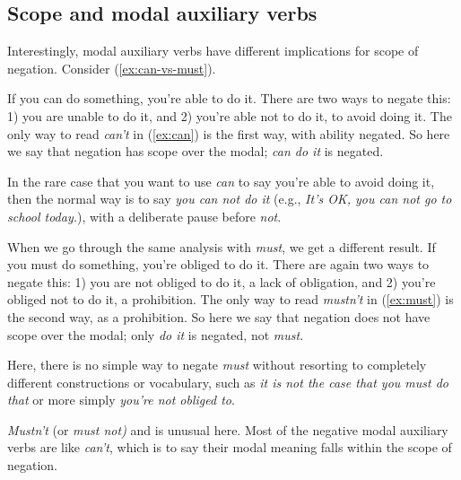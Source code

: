 \subsection{Scope and modal auxiliary verbs}

Interestingly, modal auxiliary verbs have different implications for scope of negation. Consider (\ref{ex:can-vs-must}).

\begin{multicols}{2}
\ea \label{ex:can-vs-must}
    \ea \label{ex:can}
    \z
    \ex \label{ex:must}
        \z
    \z
\z
\end{multicols}

If you can do something, you're able to do it. There are two ways to negate this: 1) you are unable to do it, and 2) you're able not to do it, to avoid doing it. The only way to read \textit{can't} in (\ref{ex:can}) is the first way, with ability negated. So here we say that negation has scope over the modal; \textit{can do it} is negated.

In the rare case that you want to use \textit{can} to say you're able to avoid doing it, then the normal way is to say \textit{you can not do it} (e.g., \textit{It's OK, you can not go to school today.}), with a deliberate pause before \textit{not}. 

When we go through the same analysis with \textit{must}, we get a different result. If you must do something, you're obliged to do it. There are again two ways to negate this: 1) you are not obliged to do it, a lack of obligation, and 2) you're obliged not to do it, a prohibition. The only way to read \textit{mustn't} in (\ref{ex:must}) is the second way, as a prohibition. So here we say that negation does not have scope over the modal; only \textit{do it} is negated, not \textit{must}.

Here, there is no simple way to negate \textit{must} without resorting to completely different constructions or vocabulary, such as \textit{it is not the case that you must do that} or more simply \textit{you're not obliged to}.

\textit{Mustn't} (or \textit{must not)} and  is unusual here. Most of the negative modal auxiliary verbs are like \textit{can't}, which is to say their modal meaning falls within the scope of negation.

